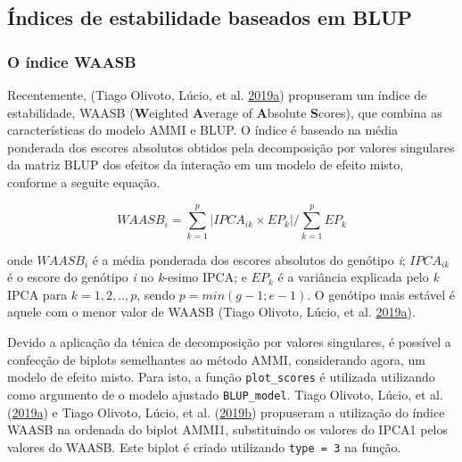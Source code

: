 \documentclass[
]{book}
\makeatletter
\numberwithin{equation}{section}
\newcommand{\indf}[1]{\index[function]{#1@\texttt{#1()}|ST}}
\makeatother
\begin{document}
\hypertarget{uxedndices-de-estabilidade-baseados-em-blup}{%
\subsection{Índices de estabilidade baseados em BLUP}\label{uxedndices-de-estabilidade-baseados-em-blup}}

\hypertarget{wsb}{%
\subsubsection{O índice WAASB}\label{wsb}}

Recentemente, (Tiago Olivoto, Lúcio, et al. \protect\hyperlink{ref-Olivoto2019}{2019}\protect\hyperlink{ref-Olivoto2019}{a}) propuseram um índice de estabilidade, WAASB (\textbf{W}eighted \textbf{A}verage of \textbf{A}bsolute \textbf{S}cores), que combina as características do modelo AMMI e BLUP. O índice é baseado na média ponderada dos escores absolutos obtidos pela decomposição por valores singulares da matriz BLUP dos efeitos da interação em um modelo de efeito misto, conforme a seguite equação.

\[
        WAASB_i  =
        \sum_{k = 1}^{p} |IPCA_{ik} \times EP_k|/ \sum_{k = 1}^{p}EP_k
\]

onde \(WAASB_i\) é a média ponderada dos escores absolutos do genótipo \emph{i}; \(IPCA_{ik}\) é o escore do genótipo \emph{i} no \emph{k}-esimo IPCA; e \(EP_k\) é a variância explicada pelo \emph{k} IPCA para \(k = 1,2, .., p\), sendo \(p = min (g-1; e-1)\). O genótipo mais estável é aquele com o menor valor de WAASB (Tiago Olivoto, Lúcio, et al. \protect\hyperlink{ref-Olivoto2019}{2019}\protect\hyperlink{ref-Olivoto2019}{a}).

Devido a aplicação da ténica de decomposição por valores singulares, é possível a confecção de biplots semelhantes ao método AMMI, considerando agora, um modelo de efeito misto. Para isto, a função \texttt{plot\_scores} \indf{plot\_scores} é utilizada utilizando como argumento de o modelo ajustado \texttt{BLUP\_model}. Tiago Olivoto, Lúcio, et al. (\protect\hyperlink{ref-Olivoto2019}{2019}\protect\hyperlink{ref-Olivoto2019}{a}) e Tiago Olivoto, Lúcio, et al. (\protect\hyperlink{ref-Olivoto2019a}{2019}\protect\hyperlink{ref-Olivoto2019a}{b}) propuseram a utilização do índice WAASB na ordenada do biplot AMMI1, substituindo os valores do IPCA1 pelos valores do WAASB. Este biplot é criado utilizando \texttt{type\ =\ 3} na função.
\end{document}
